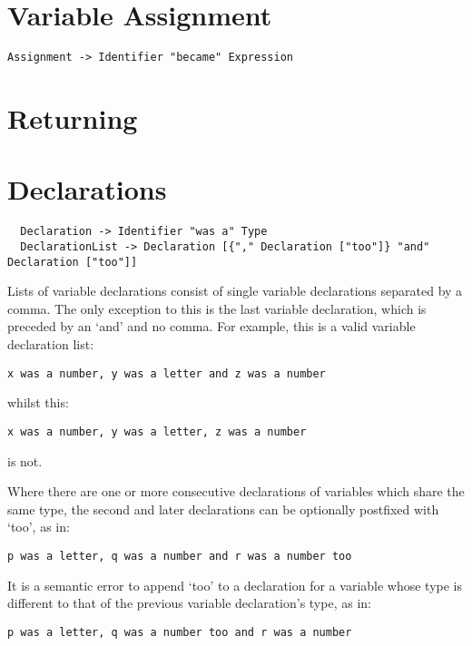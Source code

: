 \documentclass[a4wide, 11pt]{article}
\begin{document}
\section{Variable Assignment}

\begin{verbatim}
Assignment -> Identifier "became" Expression
\end{verbatim}

\section {Returning}

\section{Declarations}

\begin{verbatim}
  Declaration -> Identifier "was a" Type
  DeclarationList -> Declaration [{"," Declaration ["too"]} "and" Declaration ["too"]]
\end{verbatim}

Lists of variable declarations consist of single variable declarations separated by a comma. The only exception to this is the last variable declaration, which is preceded by an `and' and no comma. For example, this is a valid variable declaration list:

\begin{verbatim}
x was a number, y was a letter and z was a number
\end{verbatim}

whilst this:

\begin{verbatim}
x was a number, y was a letter, z was a number
\end{verbatim}

is not.

Where there are one or more consecutive declarations of variables which share the same type, the second and later declarations can be optionally postfixed with `too', as in:

\begin{verbatim}
p was a letter, q was a number and r was a number too
\end{verbatim}

It is a semantic error to append `too' to a declaration for a variable whose type is different to that of the previous variable declaration's type, as in:

\begin{verbatim}
p was a letter, q was a number too and r was a number
\end{verbatim}
\end{document}
